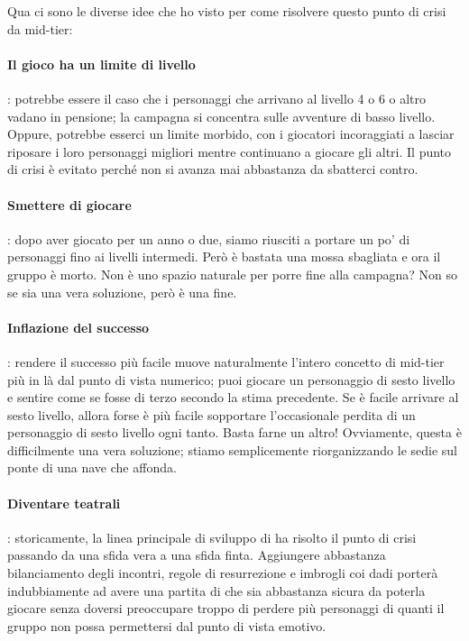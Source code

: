 Qua ci sono le diverse idee che ho visto per come risolvere questo punto di crisi da mid-tier:

\paragraph{Il gioco ha un limite di livello}: potrebbe essere il caso che i personaggi che arrivano al livello 4 o 6 o altro vadano in pensione; la campagna si concentra sulle avventure di basso livello. Oppure, potrebbe esserci un limite morbido, con i giocatori incoraggiati a lasciar riposare i loro personaggi migliori mentre continuano a giocare gli altri. Il punto di crisi è evitato perché non si avanza mai abbastanza da sbatterci contro.

\paragraph{Smettere di giocare}: dopo aver giocato per un anno o due, siamo riusciti a portare un po' di personaggi fino ai livelli intermedi. Però è bastata una mossa sbagliata e ora il gruppo è morto. Non è uno spazio naturale per porre fine alla campagna? Non so se sia una vera soluzione, però è una fine.

\paragraph{Inflazione del successo}: rendere il successo più facile muove naturalmente l'intero concetto di mid-tier più in là dal punto di vista numerico; puoi giocare un personaggio di sesto livello e sentire come se fosse di terzo secondo la stima precedente. Se è facile arrivare al sesto livello, allora forse è più facile sopportare l'occasionale perdita di un personaggio di sesto livello ogni tanto. Basta farne un altro! Ovviamente, questa è difficilmente una vera soluzione; stiamo semplicemente riorganizzando le sedie sul ponte di una nave che affonda.

\paragraph{Diventare teatrali}: storicamente, la linea principale di sviluppo di \dnd{} ha risolto il punto di crisi passando da una sfida vera a una sfida finta. Aggiungere abbastanza bilanciamento degli incontri, regole di resurrezione e imbrogli coi dadi porterà indubbiamente ad avere una partita di \dnd{} che sia abbastanza sicura da poterla giocare senza doversi preoccupare troppo di perdere più personaggi di quanti il gruppo non possa permettersi dal punto di vista emotivo.

